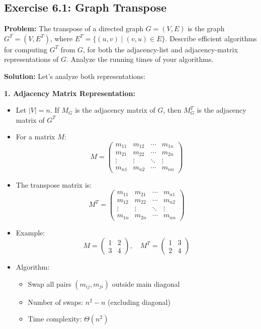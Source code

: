\subsection{Exercise 6.1: Graph Transpose}
\textbf{Problem:} The transpose of a directed graph $G = (V,E)$ is the graph $G^T = (V,E^T)$, where $E^T = \{(u,v) \mid (v,u) \in E\}$. Describe efficient algorithms for computing $G^T$ from $G$, for both the adjacency-list and adjacency-matrix representations of $G$. Analyze the running times of your algorithms.

\textbf{Solution:} Let's analyze both representations:

\textbf{1. Adjacency Matrix Representation:}
\begin{itemize}[noitemsep]
    \item Let $|V| = n$. If $M_G$ is the adjacency matrix of $G$, then $M_G^T$ is the adjacency matrix of $G^T$
    \item For a matrix $M$:
        \[ M = \begin{pmatrix}
            m_{11} & m_{12} & \cdots & m_{1n} \\
            m_{21} & m_{22} & \cdots & m_{2n} \\
            \vdots & \vdots & \ddots & \vdots \\
            m_{n1} & m_{n2} & \cdots & m_{nn}
        \end{pmatrix} \]
    \item The transpose matrix is:
        \[ M^T = \begin{pmatrix}
            m_{11} & m_{21} & \cdots & m_{n1} \\
            m_{12} & m_{22} & \cdots & m_{n2} \\
            \vdots & \vdots & \ddots & \vdots \\
            m_{1n} & m_{2n} & \cdots & m_{nn}
        \end{pmatrix} \]
    \item Example:
        \[ M = \begin{pmatrix}
            1 & 2 \\
            3 & 4
        \end{pmatrix}, \quad
        M^T = \begin{pmatrix}
            1 & 3 \\
            2 & 4
        \end{pmatrix} \]
    \item Algorithm:
        \begin{itemize}[noitemsep]
            \item Swap all pairs $(m_{ij}, m_{ji})$ outside main diagonal
            \item Number of swaps: $n^2 - n$ (excluding diagonal)
            \item Time complexity: $\Theta(n^2)$
        \end{itemize}
\end{itemize}

